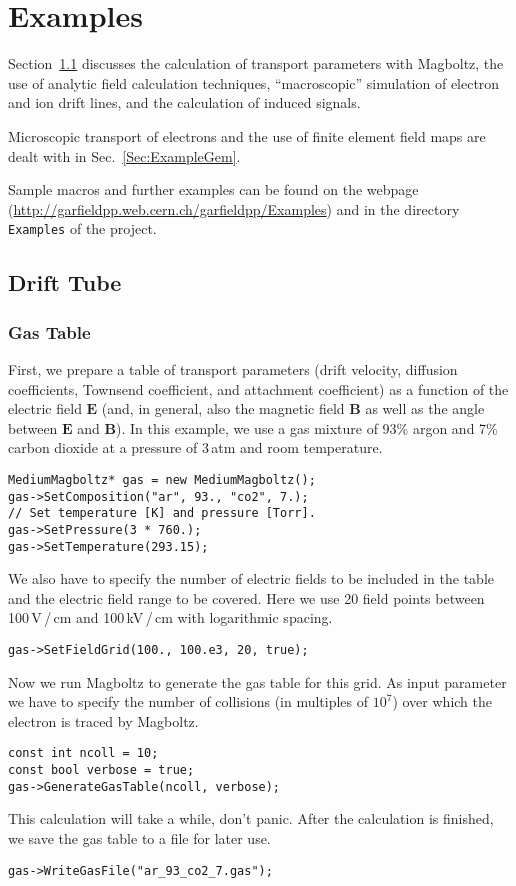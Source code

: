 \section{Examples}

Section~\ref{Sec:ExampleTube} discusses the 
calculation of transport parameters with Magboltz, 
the use of analytic field calculation techniques, 
``macroscopic'' simulation of electron and ion drift lines, 
and the calculation of induced signals. 
 
Microscopic transport of electrons and 
the use of finite element field maps are dealt with in 
Sec.~\ref{Sec:ExampleGem}. 

Sample macros and further examples can be found on the webpage 
(\url{http://garfieldpp.web.cern.ch/garfieldpp/Examples}) and 
in the directory \texttt{Examples} of the project.
 
\subsection{Drift Tube}\label{Sec:ExampleTube}

\subsubsection{Gas Table}
First, we prepare a table of transport parameters 
(drift velocity, diffusion coefficients, Townsend coefficient,
and attachment coefficient) as a function 
of the electric field \(\mathbf{E}\)  
(and, in general, also the magnetic field \(\mathbf{B}\) 
as well as the angle between \(\mathbf{E}\) and \(\mathbf{B}\)).
In this example, we use a gas mixture of 93\% argon and 7\% 
carbon dioxide at a pressure of 3\,atm and room temperature.
\begin{lstlisting}
MediumMagboltz* gas = new MediumMagboltz();
gas->SetComposition("ar", 93., "co2", 7.);
// Set temperature [K] and pressure [Torr].
gas->SetPressure(3 * 760.);
gas->SetTemperature(293.15);
\end{lstlisting} 
We also have to specify the number of electric fields to be 
included in the table and the electric field range to be covered. 
Here we use 20 field points between 100\,V\,/\,cm and 100\,kV\,/\,cm 
with logarithmic spacing. 
\begin{lstlisting}
gas->SetFieldGrid(100., 100.e3, 20, true);
\end{lstlisting}
Now we run Magboltz to generate the gas table for this grid. 
As input parameter we have to specify the number of collisions 
(in multiples of \(10^{7}\)) over which the electron is traced 
by Magboltz.
\begin{lstlisting}
const int ncoll = 10;
const bool verbose = true;
gas->GenerateGasTable(ncoll, verbose);
\end{lstlisting}
This calculation will take a while, don't panic. 
After the calculation is finished, we save the gas table to a 
file for later use.
\begin{lstlisting}
gas->WriteGasFile("ar_93_co2_7.gas");
\end{lstlisting}

